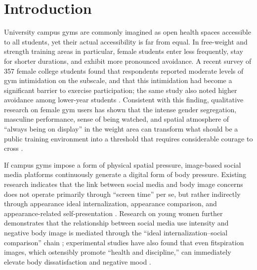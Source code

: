 \section{Introduction}

University campus gyms are commonly imagined as open health spaces accessible to all students, yet their actual accessibility is far from equal.
In free-weight and strength training areas in particular, female students enter less frequently, stay for shorter durations, and exhibit more pronounced avoidance.
A recent survey of 357 female college students found that respondents reported moderate levels of gym intimidation on the \textcite{levinson2013seam} subscale, and that this intimidation had become a significant barrier to exercise participation; the same study also noted higher avoidance among lower-year students \parencite{rendall2024gym}.
Consistent with this finding, qualitative research on female gym users has shown that the intense gender segregation, masculine performance, sense of being watched, and spatial atmosphere of ``always being on display'' in the weight area can transform what should be a public training environment into a threshold that requires considerable courage to cross \parencite{turnock2021gyms}.

If campus gyms impose a form of physical spatial pressure, image-based social media platforms continuously generate a digital form of body pressure.
Existing research indicates that the link between social media and body image concerns does not operate primarily through ``screen time'' per se, but rather indirectly through appearance ideal internalization, appearance comparison, and appearance-related self-presentation \parencite{fardouly2016social}.
Research on young women further demonstrates that the relationship between social media use intensity and negative body image is mediated through the ``ideal internalization--social comparison'' chain \parencite{jung2022social}; experimental studies have also found that even fitspiration images, which ostensibly promote ``health and discipline,'' can immediately elevate body dissatisfaction and negative mood \parencite{tiggemann2015fitspiration}.

